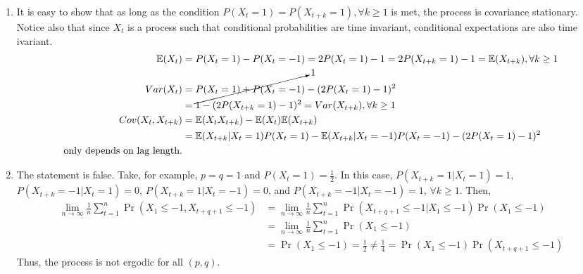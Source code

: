 \documentclass[]{article}
\begin{document}
\begin{enumerate}[label=\alph*)]
	\item It is easy to show that as long as the condition $P(X_t=1)=P(X_{t+k}=1), \forall k\geq1$ is met, the process is covariance stationary. Notice also that since ${X_t}$ is a process such that conditional probabilities are time invariant, conditional expectations are also time ivariant.
	\begin{equation}
		\begin{split}
		\mathbb{E}(X_t)& = P(X_t=1)-P(X_t=-1) = 2P(X_t=1) - 1 = 2P(X_{t+k}=1) - 1=\mathbb{E}(X_{t+k}), \forall k\geq1\\ \nonumber
		Var(X_t)& = \cancelto{1}{P(X_t=1)+P(X_t=-1)}-(2P(X_t=1) - 1)^2\\
		& = 1-(2P(X_{t+k}=1) - 1)^2 = Var(X_{t+k}), \forall k\geq1 \\
		Cov(X_t, X_{t+k})& = \mathbb{E}(X_tX_{t+k})-\mathbb{E}(X_t)\mathbb{E}(X_{t+k})\\
		& =  \mathbb{E}(X_{t+k}|X_t=1)P(X_t=1)-\mathbb{E}(X_{t+k}|X_t=-1)P(X_t=-1)-(2P(X_t=1)-1)^2 \\ \text{only depends on lag length.}
		\end{split}
	\end{equation}
	
	 \item The statement is false. Take, for example, $p=q=1$ and $P(X_t=1)=\frac{1}{2}$. In this case, $P(X_{t+k}=1|X_t=1)=1$, $P(X_{t+k}=-1|X_t=1)=0$, $P(X_{t+k}=1|X_t=-1)=0$, and  $P(X_{t+k}=-1|X_t=-1)=1$, $\forall k\geq1$. Then,
	 \begin{equation}
	 	\begin{split}
	 	\lim\limits_{n\to\infty}\frac{1}{n}\sum\limits_{t=1}^{n}\Pr(X_1\leq-1, X_{t+q+1}\leq-1)& = \lim\limits_{n\to\infty}\frac{1}{n}\sum\limits_{t=1}^{n}\Pr(X_{t+q+1}\leq-1|X_1\leq-1)\Pr(X_1\leq-1) \\ \nonumber
	 	& = \lim\limits_{n\to\infty}\frac{1}{n}\sum\limits_{t=1}^{n}\Pr(X_1\leq-1)\\
	 	& = \Pr(X_1\leq-1) = \frac{1}{2} \neq \frac{1}{4} = \Pr(X_1\leq-1)\Pr(X_{t+q+1}\leq-1)
	 	\end{split}
	 \end{equation}
	 Thus, the process is not ergodic for all $(p,q)$.
	 

\end{enumerate}
\end{document}
